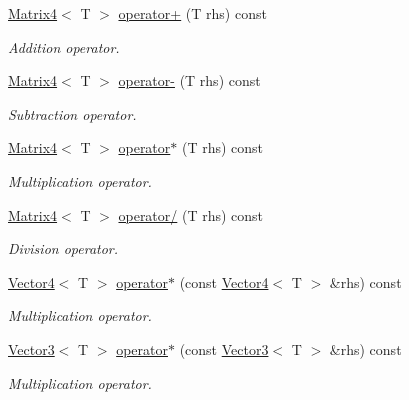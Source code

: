 \begin{DoxyCompactItemize}
\hyperlink{class_matrix4}{Matrix4}$<$ T $>$ \hyperlink{class_matrix4_a5b7adc0c653a4c261f563d9a4ad9a095}{operator+} (T rhs) const 
\begin{DoxyCompactList}\small\item\em Addition operator. \item\end{DoxyCompactList}\item 
\hyperlink{class_matrix4}{Matrix4}$<$ T $>$ \hyperlink{class_matrix4_aa8aa96061eba82c08bac660b75ce46b1}{operator-\/} (T rhs) const 
\begin{DoxyCompactList}\small\item\em Subtraction operator. \item\end{DoxyCompactList}\item 
\hyperlink{class_matrix4}{Matrix4}$<$ T $>$ \hyperlink{class_matrix4_ade719cd04adda7472e087c665546df47}{operator$\ast$} (T rhs) const 
\begin{DoxyCompactList}\small\item\em Multiplication operator. \item\end{DoxyCompactList}\item 
\hyperlink{class_matrix4}{Matrix4}$<$ T $>$ \hyperlink{class_matrix4_a2048ef268e7a5ddc6c10dc2ec7952962}{operator/} (T rhs) const 
\begin{DoxyCompactList}\small\item\em Division operator. \item\end{DoxyCompactList}\item 
\hyperlink{class_vector4}{Vector4}$<$ T $>$ \hyperlink{class_matrix4_adc1e42ef0b1606d6824f44d5ad87f23c}{operator$\ast$} (const \hyperlink{class_vector4}{Vector4}$<$ T $>$ \&rhs) const 
\begin{DoxyCompactList}\small\item\em Multiplication operator. \item\end{DoxyCompactList}\item 
\hyperlink{class_vector3}{Vector3}$<$ T $>$ \hyperlink{class_matrix4_aaf6ce02d773283e544fd781abaa1ab5c}{operator$\ast$} (const \hyperlink{class_vector3}{Vector3}$<$ T $>$ \&rhs) const 
\begin{DoxyCompactList}\small\item\em Multiplication operator. \item\end{DoxyCompactList}\item 

\end{DoxyCompactItemize}
